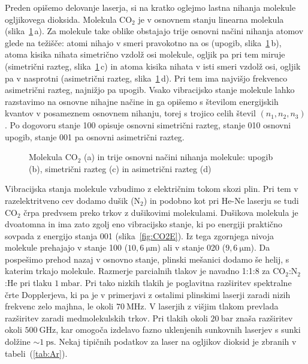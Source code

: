 Preden opišemo delovanje laserja, si na kratko oglejmo lastna nihanja molekule 
ogljikovega dioksida. Molekula CO$_2$ je v osnovnem stanju linearna molekula 
(slika~\ref{fig:CO2}\,a). 
Za molekule take oblike obstajajo trije osnovni načini nihanja atomov glede na težišče:
atomi nihajo v smeri pravokotno na os (upogib, slika~\ref{fig:CO2}\,b),
atoma kisika nihata simetrično vzdolž osi molekule, ogljik pa pri tem miruje
(simetrični razteg, slika~\ref{fig:CO2}\,c) in atoma kisika nihata v isti smeri 
vzdolž osi, ogljik pa v nasprotni (asimetrični razteg, slika~\ref{fig:CO2}\,d). 
Pri tem ima najvišjo frekvenco asimetrični razteg, najnižjo pa upogib. 
Vsako vibracijsko stanje molekule lahko razstavimo na osnovne nihajne načine in 
ga opišemo s številom energijskih kvantov v posameznem osnovnem nihanju, 
torej s trojico celih števil $(n_1,n_2,n_3)$. Po dogovoru stanje 100 opisuje
osnovni simetrični razteg, stanje 010 osnovni upogib, stanje 001 pa 
osnovni asimetrični razteg.

\begin{figure}[h]
\centering
\def\svgwidth{100truemm} 

\caption{Molekula CO$_2$ (a) in trije osnovni načini nihanja molekule:
upogib (b), simetrični razteg (c) in asimetrični razteg (d)}
\label{fig:CO2}
\end{figure}

Vibracijska stanja molekule vzbudimo z električnim tokom skozi plin. 
Pri tem v razelektritveno cev dodamo dušik (N$_2$) in podobno kot pri He-Ne laserju
se tudi CO$_2$ črpa predvsem preko trkov z dušikovimi molekulami. 
Dušikova molekula je dvoatomna in ima zato zgolj eno vibracijsko stanje, ki po energiji
praktično sovpada z energijo stanja 001 (slika~\ref{fig:CO2E}). Iz tega zgornjega
nivoja molekule prehajajo v stanje 100 ($10,6~\si{\micro\metre}$) ali v stanje
020 ($9,6~\si{\micro\metre}$). Da pospešimo prehod nazaj v osnovno stanje, 
plinski mešanici dodamo še helij, s katerim trkajo molekule.
Razmerje parcialnih tlakov je navadno 1:1:8 za CO$_2$:N$_2$:He pri tlaku $1~\si{\milli\bar}$. 
Pri tako nizkih tlakih je poglavitna razširitev spektralne črte Dopplerjeva, 
ki 
pa je v primerjavi z ostalimi plinskimi laserji zaradi nizih frekvenc zelo majhna,
le okoli $70~\si{\mega\hertz}$. V laserjih z višjim tlakom 
prevlada razširitev zaradi medmolekulskih trkov. Pri tlakih okoli $20~\si{\bar}$
znaša razširitev okoli $500~\si{\giga\hertz}$, kar omogoča izdelavo fazno uklenjenih 
sunkovnih laserjev s sunki dolžine $\sim 1~\si{\pico\second}$. Nekaj tipičnih podatkov 
za laser na ogljikov dioksid je zbranih v tabeli~(\ref{tab:Ar}).

